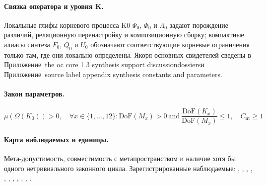 \paragraph{Связка оператора и уровня K.}
Локальные глифы корневого процесса K0 \(\Psi_0\), \(\Phi_0\) и \(\Lambda_0\) задают порождение различий, реляционную перенастройку и композиционную сборку; компактные алиасы синтеза \(F_0\), \(Q_0\) и \(U_0\) обозначают соответствующие корневые ограничения только там, где они локально определены.
Якоря основных свидетелей сведены в Приложение~the oc core 1 3 synthesis support discussiondossiersи Приложение~source label appendix synthesis constants and parameters.

\paragraph{Закон параметров.}
\[
\mu(\Omega(K_0)) > 0,\quad \forall x \in \{1,\dots,12\}: \mathrm{DoF}(M_x)>0\ \mathrm{and}\ \frac{\mathrm{DoF}(K_x)}{\mathrm{DoF}(M_x)} \leq 1,\quad C_{\mathrm{nt}} \geq 1
\]

\paragraph{Карта наблюдаемых и единицы.}
Мета-допустимость, совместимость с метапространством и наличие хотя бы одного нетривиального законного цикла.
Зарегистрированные наблюдаемые: , \allowbreak {}, \allowbreak {}, \allowbreak {}, \allowbreak {}, \allowbreak {}, \allowbreak {}, \allowbreak {}, \allowbreak {}, \allowbreak {}, \allowbreak {}.

